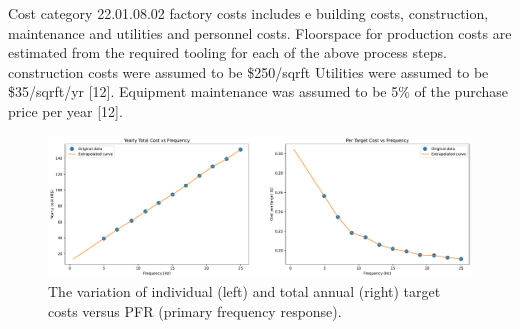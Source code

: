 Cost category 22.01.08.02 factory costs includes e building costs, construction, maintenance and utilities and
personnel costs. Floorspace for production costs are estimated from the required tooling for each of the above process steps. construction costs were assumed to be \$250/sqrft Utilities were assumed to
be \$35/sqrft/yr [12]. Equipment maintenance was assumed to be 5\% of the
purchase price per year [12]. 

\begin{figure}
    \centering
    \includegraphics[width=0.9\linewidth]{Figures/targetPFR.pdf}
    \caption{The variation of individual (left) and total annual (right) target costs versus PFR (primary frequency response).}
    \label{fig:targetPFR}
\end{figure}



